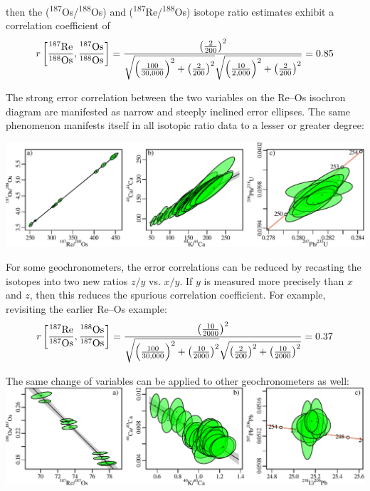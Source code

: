 \begin{refsection}
\noindent then the (\textsuperscript{187}Os/\textsuperscript{188}Os)
and (\textsuperscript{187}Re/\textsuperscript{188}Os) isotope ratio
estimates exhibit a correlation coefficient of
\[
  \noindent r\left[\frac{{}^{187}\mbox{Re}}{{}^{188}\mbox{Os}},
                   \frac{{}^{187}\mbox{Os}}{{}^{188}\mbox{Os}}\right]
  =
  \frac{
    \left(\frac{2}{200}\right)^2
  }{
    \sqrt{\left(\frac{100}{30,000}\right)^2 +
      \left(\frac{2}{200}\right)^2}
    \sqrt{\left(\frac{10}{2,000}\right)^2 +
      \left(\frac{2}{200}\right)^2}
  }
  = 0.85
\]

The strong error correlation between the two variables on the Re--Os
isochron diagram are manifested as narrow and steeply inclined error
ellipses. The same phenomenon manifests itself in all isotopic ratio
data to a lesser or greater degree:

\noindent\includegraphics[width=\textwidth]{../figures/errorcorrelation_edited.pdf}
\begingroup
{}
\label{fig:errorcorrelation}
\endgroup

For some geochronometers, the error correlations can be reduced by
recasting the isotopes into two new ratios $z/y$ vs. $x/y$. If $y$ is
measured more precisely than $x$ and $z$, then this reduces the
spurious correlation coefficient. For example, revisiting the earlier
Re--Os example:
\[
  \noindent r\left[\frac{{}^{187}\mbox{Re}}{{}^{187}\mbox{Os}},
                   \frac{{}^{188}\mbox{Os}}{{}^{187}\mbox{Os}}\right]
  =
  \frac{
    \left(\frac{10}{2000}\right)^2
  }{
    \sqrt{\left(\frac{100}{30,000}\right)^2 +
      \left(\frac{10}{2000}\right)^2}
    \sqrt{\left(\frac{2}{200}\right)^2 +
      \left(\frac{10}{2000}\right)^2}
  }
  = 0.37
\]

The same change of variables can be applied to other geochronometers
as well:\\

\noindent\includegraphics[width=\textwidth]{../figures/inverrorcorrelation_edited.pdf}
\begingroup
{}
\label{fig:inverrorcorrelation}
\endgroup


\end{refsection}
